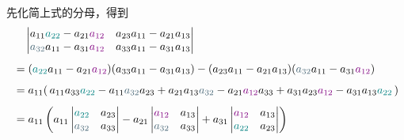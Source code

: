 \documentclass[10pt,openany]{article}
\theoremstyle{thmstyle} %
\theoremstyle{defstyle} %
\theoremstyle{prostyle} %
\theoremstyle{exastyle}
\theoremstyle{remstyle}
\begin{document}
先化简上式的分母，得到
\begin{align*}
	& \quad \begin{vmatrix}
		a_{11} {\color{teal} a_{22}} - a_{21} {\color{violet} a_{12}} & a_{23} a_{11} - a_{21} a_{13} \\
		{\color{cyan!40!black} a_{32}} a_{11} - a_{31} {\color{violet} a_{12}} & a_{33} a_{11} - a_{31} a_{13}
	\end{vmatrix} \\[1ex]
	&= ({\color{teal} a_{22}} a_{11} - a_{21} {\color{violet} a_{12}})(a_{33} a_{11} - a_{31} a_{13}) - (a_{23} a_{11} - a_{21} a_{13})({\color{cyan!40!black} a_{32}} a_{11} - a_{31} {\color{violet} a_{12}}) \\[1ex]
	&= a_{11}(\, a_{11} a_{33} {\color{teal} a_{22}}- a_{11} {\color{cyan!40!black} a_{32}} a_{23}  + a_{21} a_{13} {\color{cyan!40!black} a_{32}} - a_{21} {\color{violet} a_{12}} a_{33} + a_{31} a_{23} {\color{violet} a_{12}} - a_{31} a_{13}  {\color{teal} a_{22}}   \,) \\[1ex]
	&= a_{11} \left( a_{11} \begin{vmatrix}
{\color{teal} a_{22}} & a_{23} \\
{\color{cyan!40!black} a_{32}} & a_{33}
	\end{vmatrix}
	- a_{21} \begin{vmatrix}
		{\color{violet} a_{12}} & a_{13} \\
		{\color{cyan!40!black} a_{32}} & a_{33} 
	\end{vmatrix}
	+ a_{31} \begin{vmatrix}
		{\color{violet} a_{12}} & a_{13} \\
		{\color{teal} a_{22}} & a_{23} 
	\end{vmatrix} \right)
\end{align*}
\end{document}
